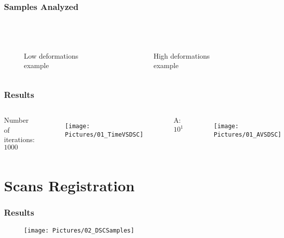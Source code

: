 \documentclass[xcolor=table]{beamer}
\begin{document}
\begin{frame}
	\frametitle{Samples Analyzed}
	\begin{columns}
		\centering
		\begin{figure}
			\\\vspace{2mm}
			\caption{Low deformations example}
		\end{figure}
		\centering
		\begin{figure}
			\\\vspace{2mm}
			\caption{High deformations example}
		\end{figure}
	\end{columns}
\end{frame}



\begin{frame}
	\frametitle{Results}
	\begin{columns}
		\column[c]{0.45\linewidth}
		\centering
		Number of iterations: $1000$
		\begin{figure}
			\texttt{[image: Pictures/01\_TimeVSDSC]}
		\end{figure}
		\column[c]{0.45\linewidth}
		\centering
		A: $10^1$
		\begin{figure}
			\texttt{[image: Pictures/01\_AVSDSC]}
		\end{figure}
	\end{columns}
\end{frame}



\section{Scans Registration}


\begin{frame}
	\frametitle{Results}
	\begin{figure}
		\texttt{[image: Pictures/02\_DSCSamples]}
	\end{figure}
\end{frame}

\appendix
\end{document}
